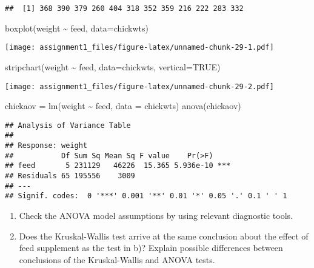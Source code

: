 \documentclass[
]{article}
\newenvironment{Shaded}{\begin{snugshade}}{\end{snugshade}}
\newcommand{\AttributeTok}[1]{\textcolor[rgb]{0.77,0.63,0.00}{#1}}
\newcommand{\ConstantTok}[1]{\textcolor[rgb]{0.00,0.00,0.00}{#1}}
\newcommand{\FunctionTok}[1]{\textcolor[rgb]{0.00,0.00,0.00}{#1}}
\newcommand{\NormalTok}[1]{#1}
\newcommand{\OtherTok}[1]{\textcolor[rgb]{0.56,0.35,0.01}{#1}}
\newcommand{\SpecialCharTok}[1]{\textcolor[rgb]{0.00,0.00,0.00}{#1}}
\begin{document}
\begin{verbatim}
##  [1] 368 390 379 260 404 318 352 359 216 222 283 332
\end{verbatim}

\begin{Shaded}
\begin{Highlighting}[]
\FunctionTok{boxplot}\NormalTok{(weight }\SpecialCharTok{\textasciitilde{}}\NormalTok{ feed, }\AttributeTok{data=}\NormalTok{chickwts)}
\end{Highlighting}
\end{Shaded}

\texttt{[image: assignment1\_files/figure-latex/unnamed-chunk-29-1.pdf]}

\begin{Shaded}
\begin{Highlighting}[]
\FunctionTok{stripchart}\NormalTok{(weight }\SpecialCharTok{\textasciitilde{}}\NormalTok{ feed, }\AttributeTok{data=}\NormalTok{chickwts, }\AttributeTok{vertical=}\ConstantTok{TRUE}\NormalTok{)}
\end{Highlighting}
\end{Shaded}

\texttt{[image: assignment1\_files/figure-latex/unnamed-chunk-29-2.pdf]}

\begin{Shaded}
\begin{Highlighting}[]
\NormalTok{chickaov }\OtherTok{=} \FunctionTok{lm}\NormalTok{(weight }\SpecialCharTok{\textasciitilde{}}\NormalTok{ feed, }\AttributeTok{data =}\NormalTok{ chickwts)}
\FunctionTok{anova}\NormalTok{(chickaov)}
\end{Highlighting}
\end{Shaded}

\begin{verbatim}
## Analysis of Variance Table
## 
## Response: weight
##           Df Sum Sq Mean Sq F value    Pr(>F)    
## feed       5 231129   46226  15.365 5.936e-10 ***
## Residuals 65 195556    3009                      
## ---
## Signif. codes:  0 '***' 0.001 '**' 0.01 '*' 0.05 '.' 0.1 ' ' 1
\end{verbatim}

\begin{enumerate}
\def\labelenumi{\alph{enumi})}
\setcounter{enumi}{2}
\item
  Check the ANOVA model assumptions by using relevant diagnostic tools.
\item
  Does the Kruskal-Wallis test arrive at the same conclusion about the
  effect of feed supplement as the test in b)? Explain possible
  differences between conclusions of the Kruskal-Wallis and ANOVA tests.
\end{enumerate}
\end{document}
